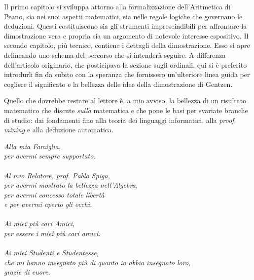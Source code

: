 		Il primo capitolo si sviluppa attorno alla formalizzazione dell'Aritmetica di Peano, sia nei suoi aspetti matematici, sia nelle regole logiche che governano le deduzioni. Questi costituiscono sia gli strumenti imprescindibili per affrontare la dimostrazione vera e propria sia un argomento di notevole interesse espositivo.
		Il secondo capitolo, più tecnico, contiene i dettagli della dimostrazione. Esso si apre delineando uno schema del percorso che si intenderà seguire. A differenza dell'articolo originario, che posticipava la sezione sugli ordinali, qui si è preferito introdurli fin da subito con la speranza che fornissero un'ulteriore linea guida per cogliere il significato e la bellezza delle idee della dimostrazione di Gentzen.
		
		Quello che dovrebbe restare al lettore è, a mio avviso, la bellezza di un risultato matematico che discute \emph{sulla} matematica e che pone le basi per svariate branche di studio: dai fondamenti fino alla teoria dei linguaggi informatici, alla \textit{proof mining} e alla deduzione automatica.
		\newpage
		\thispagestyle{empty}
		\phantom{x}
		\vspace{3,8cm}
	\begin{flushright}
		\textit{Alla mia Famiglia, \\ per avermi sempre supportato.} \\ \phantom{x} \\
		\textit{Al mio Relatore, prof. Pablo Spiga, \\ per avermi mostrato la bellezza nell'Algebra, \\ per avermi concesso totale libertà \\ e per avermi aperto gli occhi.} \\ \phantom{x} \\
		\textit{Ai miei più cari Amici, \\ per essere i miei più cari amici.} \\ \phantom{x} \\
		\textit{Ai miei Studenti e Studentesse, \\ che mi hanno insegnato più di quanto io abbia insegnato loro, \\ grazie di cuore.}
	\end{flushright} \vspace{3cm}

